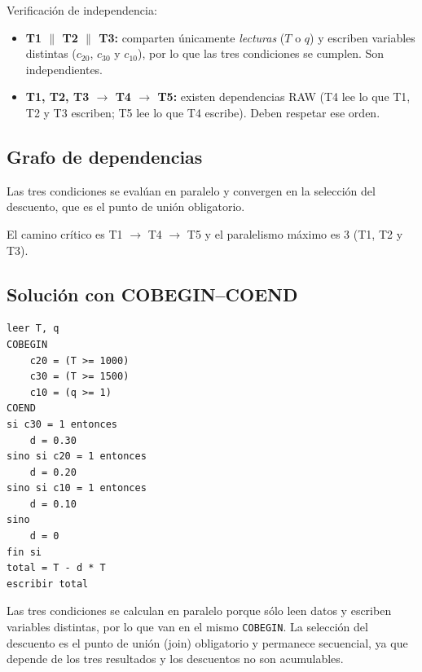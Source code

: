 Verificaci\'on de independencia:
\begin{itemize}[leftmargin=1.4cm]
    \item \textbf{T1 $\parallel$ T2 $\parallel$ T3:} comparten \'unicamente
    \emph{lecturas} ($T$ o $q$) y escriben variables distintas ($c_{20}$,
    $c_{30}$ y $c_{10}$), por lo que las tres condiciones se cumplen. Son
    independientes.
    \item \textbf{T1, T2, T3 $\rightarrow$ T4 $\rightarrow$ T5:} existen
    dependencias RAW (T4 lee lo que T1, T2 y T3 escriben; T5 lee lo que T4
    escribe). Deben respetar ese orden.
\end{itemize}

\subsection*{Grafo de dependencias}
Las tres condiciones se eval\'uan en paralelo y convergen en la selecci\'on del
descuento, que es el punto de uni\'on obligatorio.

\begin{center}
\end{center}

El camino cr\'itico es T1 $\rightarrow$ T4 $\rightarrow$ T5 y el paralelismo
m\'aximo es 3 (T1, T2 y T3).

\subsection*{Soluci\'on con COBEGIN--COEND}
\begin{lstlisting}
leer T, q
COBEGIN
    c20 = (T >= 1000)
    c30 = (T >= 1500)
    c10 = (q >= 1)
COEND
si c30 = 1 entonces
    d = 0.30
sino si c20 = 1 entonces
    d = 0.20
sino si c10 = 1 entonces
    d = 0.10
sino
    d = 0
fin si
total = T - d * T
escribir total
\end{lstlisting}

\noindent
Las tres condiciones se calculan en paralelo porque s\'olo leen datos y
escriben variables distintas, por lo que van en el mismo \texttt{COBEGIN}. La
selecci\'on del descuento es el punto de uni\'on (join) obligatorio y permanece
secuencial, ya que depende de los tres resultados y los descuentos no son
acumulables.
